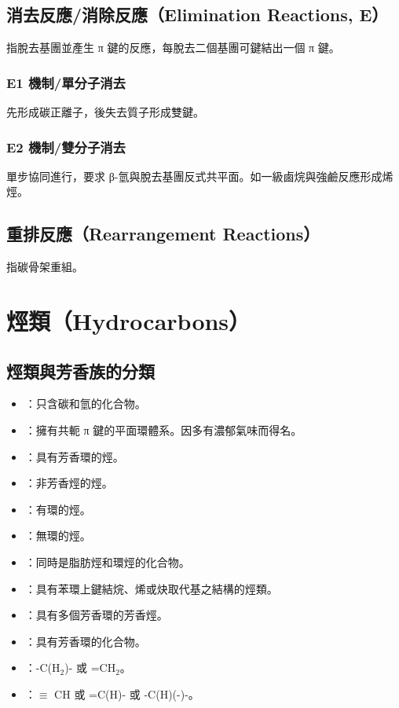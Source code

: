 \documentclass[a4paper,12pt]{report}
\begin{document}
\subsection{消去反應/消除反應（Elimination Reactions, E）}
指脫去基團並產生 π 鍵的反應，每脫去二個基團可鍵結出一個 π 鍵。
\subsubsection{E1 機制/單分子消去}
先形成碳正離子，後失去質子形成雙鍵。
\subsubsection{E2 機制/雙分子消去}
單步協同進行，要求 β-氫與脫去基團反式共平面。如一級鹵烷與強鹼反應形成烯烴。
\subsection{重排反應（Rearrangement Reactions）}
指碳骨架重組。


\section{烴類（Hydrocarbons）}
\subsection{烴類與芳香族的分類}
\begin{itemize}
\item {}：只含碳和氫的化合物。
\item {}：擁有共軛 π 鍵的平面環體系。因多有濃郁氣味而得名。
\item {}：具有芳香環的烴。
\item {}：非芳香烴的烴。
\item {}：有環的烴。
\item {}：無環的烴。
\item {}：同時是脂肪烴和環烴的化合物。
\item {}：具有苯環上鍵結烷、烯或炔取代基之結構的烴類。
\item {}：具有多個芳香環的芳香烴。
\item {}：具有芳香環的化合物。
\item {}：-C(H$_2$)- 或 =CH$_2$。
\item {}：$\equiv$ CH 或 =C(H)- 或 -C(H)(-)-。
\end{itemize}
\end{document}
